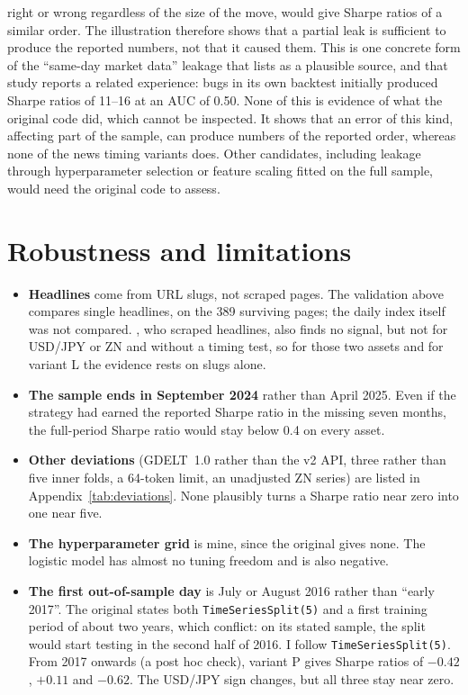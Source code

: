 \documentclass[11pt]{article}
\begin{document}
right or wrong regardless of the size of the move, would give Sharpe ratios of a similar order. The illustration
therefore shows that a partial leak is sufficient to produce the reported numbers, not that it caused them. This is one concrete form of the
``same-day market data'' leakage that \citet{andrews2026} lists as a plausible source, and that study reports a
related experience: bugs in its own backtest initially produced Sharpe ratios of 11--16 at an AUC of 0.50. None of this is
evidence of what the original code did, which cannot be inspected. It shows that an error of this kind, affecting part of the
sample, can produce numbers of the reported order, whereas none of the news timing variants does. Other candidates, including
leakage through hyperparameter selection or feature scaling fitted on the full sample, would need the original code
to assess.

\section{Robustness and limitations}
\begin{itemize}
  \item \textbf{Headlines} come from URL slugs, not scraped pages. The validation above compares single headlines,
        on the 389 surviving pages; the daily index itself was not compared. \citet{andrews2026}, who
        scraped headlines, also finds no signal, but not for USD/JPY or ZN and without a timing test, so for those two
        assets and for variant L the evidence rests on slugs alone.
  \item \textbf{The sample ends in September 2024} rather than April 2025. Even if the strategy had earned the
        reported Sharpe ratio in the missing seven months, the full-period Sharpe ratio would stay below 0.4 on every
        asset.
  \item \textbf{Other deviations} (GDELT~1.0 rather than the v2 API, three rather than five inner folds, a 64-token
        limit, an unadjusted ZN series) are listed in Appendix~\ref{tab:deviations}. None plausibly turns a Sharpe
        ratio near zero into one near five.
  \item \textbf{The hyperparameter grid} is mine, since the original gives none. The logistic model has almost no
        tuning freedom and is also negative.
  \item \textbf{The first out-of-sample day} is July or August 2016 rather than ``early 2017''. The original
        states both \texttt{TimeSeriesSplit(5)} and a first training period of about two years, which conflict:
        on its stated sample, the split would start testing in the second half of 2016. I follow
        \texttt{TimeSeriesSplit(5)}. From 2017 onwards (a post hoc check), variant P gives Sharpe ratios of $-0.42$, $+0.11$ and $-0.62$. The USD/JPY sign changes, but all
        three stay near zero.
\end{itemize}
\end{document}
